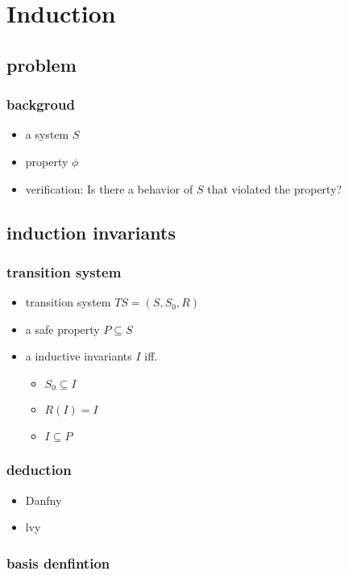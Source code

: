 \section{Induction}
\subsection{problem}
\begin{frame}
    \frametitle{backgroud}
    \begin{itemize}
        \item a system $S$
        \item property $\phi$
        \item verification: Is there a behavior of $S$ that violated the property?
    \end{itemize}
\end{frame}

\subsection{induction invariants}
\begin{frame}
    \frametitle{transition system}
    \begin{itemize}
        \item transition system $TS=(S,S_{0},R)$
        \item a safe property $P\subseteq S$
        \item a inductive invariants $I$ iff.
        \begin{itemize}
            \item $S_{0}\subseteq I$
            \item $R(I)=I$
            \item $I\subseteq P$
        \end{itemize}
    \end{itemize}
\end{frame}
\begin{frame}
    \frametitle{deduction}
    \begin{itemize}
        \item Danfny
        \item lvy
    \end{itemize}
\end{frame}

\begin{frame}
    \frametitle{basis denfintion}
\end{frame}